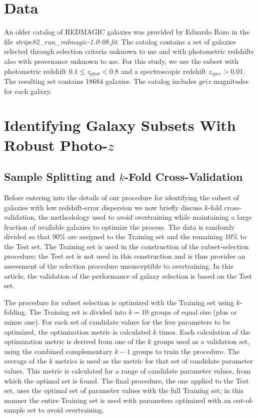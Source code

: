 \documentclass[preprint]{aastex}
\begin{document}
\section{Data}
An older catalog of REDMAGIC galaxies was provided by Eduardo Rozo in the file {\it stripe82\_\-run\_\-redmagic-1.0-08.fit}.
The catalog contains a set of galaxies selected through selection criteria unknown to me and with photometric redshifts
also with provenance unknown to me.  For this study, we use the subset with photometric redshift $0.1\le z_{phot} < 0.8$
and a spectroscopic redshift $z_{spec}>0.01$.   The resulting set contains 18684 galaxies. 
The catalog includes $griz$ magnitudes for each galaxy.



\section{Identifying Galaxy Subsets With Robust Photo-$z$}
\subsection{Sample Splitting and $k$-Fold Cross-Validation}
Before entering into the details of our procedure for identifying the subset of galaxies with low redshift-error dispersion
we now briefly discuss $k$-fold cross-validation, the methodology used to avoid overtraining while maintaining a large fraction
of available galaxies to optimize the process.  The data is randomly divided so that 90\% are assigned to
the Training set and the remaining 10\% to the Test set.  The Training set is used in the construction of the
subset-selection procedure; the Test set is not used in this construction and is thus provides an assessment of the
selection procedure unsusceptible to overtraining.  In this article, the validation of the performance of galaxy selection
is based on the Test set.

The procedure for subset selection is optimized with the Training set using $k$-folding.  The Training set is divided
into $k=10$ groups of equal size (plus or minus one).  For each set of candidate values for the
free  parameters to be optimized, the optimization metric is calculated $k$ times.  Each calculation of the optimization metric
is derived from one of the $k$ groups used as a validation set, using the combined complementary $k-1$ groups to train
the procedure.  The average of the $k$ 
metrics is used as the metric for that set of candidate parameter values.  This metric is calculated for a range of candidate
parameter values, from which the optimal set is found.  The final procedure, the one applied to the Test set, uses
the optimal set of parameter values with the full Training set; in this manner the entire Training set is used with parameters
optimized with an out-of-sample set to avoid overtraining.
\end{document}

